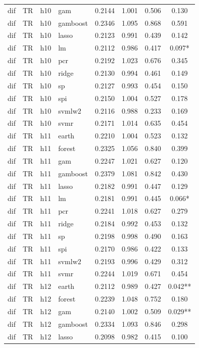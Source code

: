 \begin{ThreePartTable}
\begin{longtable}[t]{llclcccc}
dif & TR & h10 & gam & 0.2144 & 1.001 & 0.506 & 0.130\\
dif & TR & h10 & gamboost & 0.2346 & 1.095 & 0.868 & 0.591\\
dif & TR & h10 & lasso & 0.2123 & 0.991 & 0.439 & 0.142\\
dif & TR & h10 & lm & 0.2112 & 0.986 & 0.417 & 0.097*\\
dif & TR & h10 & pcr & 0.2192 & 1.023 & 0.676 & 0.345\\
dif & TR & h10 & ridge & 0.2130 & 0.994 & 0.461 & 0.149\\
dif & TR & h10 & sp & 0.2127 & 0.993 & 0.454 & 0.150\\
dif & TR & h10 & spi & 0.2150 & 1.004 & 0.527 & 0.178\\
dif & TR & h10 & svmlw2 & 0.2116 & 0.988 & 0.233 & 0.169\\
dif & TR & h10 & svmr & 0.2171 & 1.014 & 0.635 & 0.454\\
\addlinespace
dif & TR & h11 & earth & 0.2210 & 1.004 & 0.523 & 0.132\\
dif & TR & h11 & forest & 0.2325 & 1.056 & 0.840 & 0.399\\
dif & TR & h11 & gam & 0.2247 & 1.021 & 0.627 & 0.120\\
dif & TR & h11 & gamboost & 0.2379 & 1.081 & 0.842 & 0.430\\
dif & TR & h11 & lasso & 0.2182 & 0.991 & 0.447 & 0.129\\
dif & TR & h11 & lm & 0.2181 & 0.991 & 0.445 & 0.066*\\
dif & TR & h11 & pcr & 0.2241 & 1.018 & 0.627 & 0.279\\
dif & TR & h11 & ridge & 0.2184 & 0.992 & 0.453 & 0.132\\
dif & TR & h11 & sp & 0.2198 & 0.998 & 0.490 & 0.163\\
dif & TR & h11 & spi & 0.2170 & 0.986 & 0.422 & 0.133\\
dif & TR & h11 & svmlw2 & 0.2193 & 0.996 & 0.429 & 0.312\\
dif & TR & h11 & svmr & 0.2244 & 1.019 & 0.671 & 0.454\\
\addlinespace
dif & TR & h12 & earth & 0.2112 & 0.989 & 0.427 & 0.042**\\
dif & TR & h12 & forest & 0.2239 & 1.048 & 0.752 & 0.180\\
dif & TR & h12 & gam & 0.2140 & 1.002 & 0.509 & 0.029**\\
dif & TR & h12 & gamboost & 0.2334 & 1.093 & 0.846 & 0.298\\
dif & TR & h12 & lasso & 0.2098 & 0.982 & 0.415 & 0.100\\

\end{longtable}
\end{ThreePartTable}

